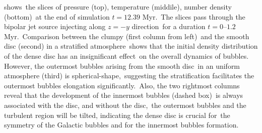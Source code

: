\documentclass[twocolumn]{aastex631}
\begin{document}
  shows\
 the slices of pressure (top), temperature (middile), number density (bottom)\
 at the end of simulation $t=12.39$ Myr.\
 The slices pass through the bipolar jet source injecting along $z=-y$ direction\
 for a duration $t=0$--$1.2$ Myr.\
 Comparison between the clumpy (first column from left)\
 and the smooth disc (second) in a stratified atmosphere\
 shows that the initial density distribution of the dense disc has an insignificant effect\
 on the overall dynamics of bubbles. However, the outermost bubbles arising from the smooth disc\
 in an uniform atmosphere (third) is spherical-shape,\
 suggesting the stratification facilitates the outermost bubbles elongation significantly.\
 Also, the two rightmost columns reveal that the development of the innermost bubbles (dashed box)\
 is always associated with the disc, and without the disc,\
 the outermost bubbles and the turbulent region will be tilted,
 indicating the dense disc is crucial for\
 the symmetry of the Galactic bubbles and for the innermost bubbles formation.
\end{document}
